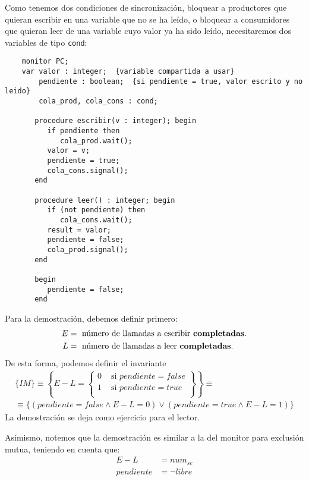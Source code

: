 Como tenemos dos condiciones de sincronización, bloquear a productores que quieran escribir en una variable que no se ha leído, o bloquear a consumidores que quieran leer de una variable cuyo valor ya ha sido leído, necesitaremos dos variables de tipo \verb|cond|:
\begin{verbatim}
    monitor PC;
    var valor : integer;  {variable compartida a usar}
        pendiente : boolean;  {si pendiente = true, valor escrito y no leido}
        cola_prod, cola_cons : cond;

       procedure escribir(v : integer); begin
          if pendiente then
             cola_prod.wait();
          valor = v;
          pendiente = true;
          cola_cons.signal();
       end

       procedure leer() : integer; begin
          if (not pendiente) then
             cola_cons.wait();
          result = valor;
          pendiente = false;
          cola_prod.signal();
       end

       begin
          pendiente = false;
       end
\end{verbatim}
Para la demostración, debemos definir primero:
\begin{align*}
    E &= \text{\ número\ de\ llamadas\ a\ escribir\ \textbf{completadas}.} \\
    L &= \text{\ número\ de\ llamadas\ a\ leer\ \textbf{completadas}.} \\
\end{align*}
De esta forma, podemos definir el invariante
\begin{gather*}
    \{IM\} \equiv 
    \left\{E-L = \left\{\begin{array}{rl}
                0 & \text{\ si\ } pendiente = false \\
                1 & \text{\ si\ } pendiente = true \\
    \end{array}\right\}\right\} \equiv  \\
    \equiv \{(pendiente = false \land E-L=0) \lor (pendiente = true \land E-L=1)\}
\end{gather*}
La demostración se deja como ejercicio para el lector.

Asímismo, notemos que la demostración es similar a la del monitor para exclusión mutua, teniendo en cuenta que:
\begin{align*}
    E - L &= num_{sc} \\
    pendiente &= \lnot libre
\end{align*}

